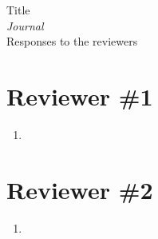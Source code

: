 \documentclass{article}
\begin{document}
\begin{center}
\begin{obeylines}
Title
\emph{Journal}
Responses to the reviewers %
\end{obeylines}
\end{center}



\section*{Reviewer \#1}
\begin{enumerate}
\item 
\end{enumerate}

\section*{Reviewer \#2}
\begin{enumerate}
\item 
 \end{enumerate}
 

 
\end{document}
